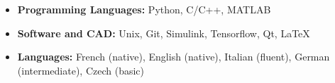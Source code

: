 \documentclass{ResumeTemplate}
\begin{document}

	\begin{tcolorbox}[colback=blue!5!white,colframe=blue!75!black,title=TECHNICAL SKILLS]
	\raggedright
	\begin{itemize}[noitemsep, leftmargin=*]
		\item \textbf{Programming Languages:} Python, C/C++,  MATLAB \\
		\item \textbf{Software and CAD:} Unix, Git, Simulink, Tensorflow, Qt, LaTeX\\
		\item \textbf{Languages:} French (native),  English (native),  Italian (fluent),  German (intermediate), Czech (basic)\vspace*{-\baselineskip}
	\end{itemize}
	~
	\end{tcolorbox}
\end{document}
